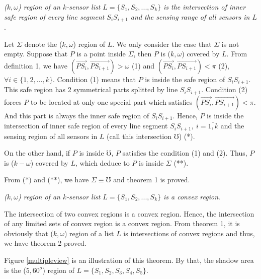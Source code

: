 \begin{thr}
{\itshape($k,\omega$) region of an $k$-sensor list $L =\{S_1,S_2,...,S_k\}$ is the intersection of inner safe region of every line segment $S_iS_{i+1}$ and the sensing range of all sensors in $L$}.
\end{thr}
\begin{pf}
	Let $\Sigma$ denote the ($k,\omega$) region of $L$. We only consider the case that $\Sigma$ is not empty. Suppose that $P$ is a point inside $\Sigma$, then $P$ is ($k,\omega$) covered by $L$. From definition 1, we have $(\overrightarrow{PS_i}, \overrightarrow{PS_{i+1}}) > \omega$ (1) and $(\overrightarrow{PS_i}, \overrightarrow{PS_{i+1}}) < \pi$ (2),\ $\forall i \in \{1,2,...,k\}$. Condition (1) means that $P$ is inside the safe region of $S_iS_{i+1}$. This safe region has 2 symmetrical parts splitted by line $S_iS_{i+1}$. Condition (2) forces $P$ to be located at only one special part which satisfies $(\overrightarrow{PS_i}, \overrightarrow{PS_{i+1}}) < \pi$. And this part is always the inner safe region of $S_iS_{i+1}$. Hence, $P$ is inside the intersection of inner safe region of every line segment $S_iS_{i+1},\ i=\overline{1,k}$ and the sensing region of all sensors in $L$ (call this intersection $\mho$) (*).\par
\indent On the other hand, if $P$ is inside $\mho$, $P$ satisfies the condition (1) and (2). Thus, $P$ is ($k-\omega$) covered by $L$, which deduce to $P$ is inside $\Sigma$ (**).\par
\indent From (*) and (**), we have $\Sigma \equiv \mho$ and theorem 1 is proved.
\end{pf}
\begin{thr}
{\itshape($k,\omega$) region of an $k$-sensor list $L =\{S_1,S_2,...,S_k\}$ is a convex region}.
\end{thr}
\begin{pf}
The intersection of two convex regions is a convex region. Hence, the intersection of any limited sets of convex region is a convex region. From theorem 1, it is obviously that ($k,\omega$) region of a list $L$ is intersections of convex regions and thus, we have theorem 2 proved.
\end{pf}
Figure \ref{multipleview} is an illustration of this theorem. By that, the shadow area is the ($5,60^o$) region of $L=\{S_1,S_2,S_3,S_4,S_5\}$.
